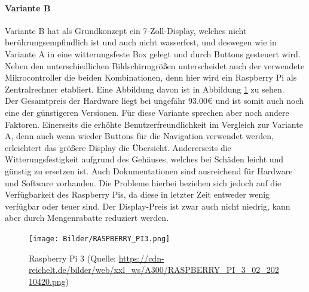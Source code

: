 \paragraph{Variante B}
Variante B hat als Grundkonzept ein 7-Zoll-Display, welches nicht berührungsempfindlich ist und auch nicht wasserfest, und deswegen wie in Variante A in eine witterungsfeste Box gelegt und durch Buttons gesteuert wird. Neben den unterschiedlichen Bildschirmgrößen unterscheidet auch der verwendete Mikrocontroller die beiden Kombinationen, denn hier wird ein Raspberry Pi als Zentralrechner etabliert. Eine Abbildung davon ist in Abbildung \ref{fig:raspi3} zu sehen.\\
Der Gesamtpreis der Hardware liegt bei ungefähr 93.00€ und ist somit auch noch eine der günstigeren Versionen. Für diese Variante sprechen aber noch andere Faktoren. Einerseits die erhöhte Benutzerfreundlichkeit im Vergleich zur Variante A, denn auch wenn wieder Buttons für die Navigation verwendet werden, erleichtert das größere Display die Übersicht. Andererseits die Witterungsfestigkeit aufgrund des Gehäuses, welches bei Schäden leicht und günstig zu ersetzen ist. Auch Dokumentationen sind ausreichend für Hardware und Software vorhanden. Die Probleme hierbei beziehen sich jedoch auf die Verfügbarkeit des Raspberry Pis, da diese in letzter Zeit entweder wenig verfügbar oder teuer sind. Der Display-Preis ist zwar auch nicht niedrig, kann aber durch Mengenrabatte reduziert werden.
\begin{figure}[ht]
	\centering
	\texttt{[image: Bilder/RASPBERRY\_PI3.png]}
	\caption{Raspberry Pi 3 (Quelle: \url{https://cdn-reichelt.de/bilder/web/xxl_ws/A300/RASPBERRY_PI_3_02_20210420.png})}
	\label{fig:raspi3}
\end{figure}
